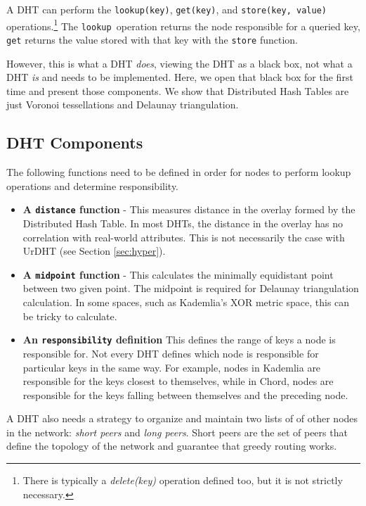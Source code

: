 \documentclass[11pt,conference]{IEEEtran}
\begin{document}
A DHT can perform the \texttt{lookup(key)}, \texttt{get(key)}, and \texttt{store(key, value)} operations.\footnote{There is typically a \textit{delete(key)} operation defined too, but it is not strictly necessary.}
The \texttt{lookup }operation returns the node responsible for a queried key, \texttt{get} returns the value stored with that key with the \texttt{store} function.

However, this is what a DHT \textit{does}, viewing the DHT as a black box, not what a DHT \textit{is} and needs to be implemented.
Here, we open that black box for the first time and present those components.
We show that Distributed Hash Tables are just Voronoi tessellations and Delaunay triangulation.


\subsection{DHT Components}
The following functions need to be defined in order for nodes to perform lookup operations and determine responsibility.

\begin{itemize}
	\item \textbf{A \texttt{distance} function } - 
	This measures distance in the overlay formed by the Distributed Hash Table.
	In most DHTs, the distance in the overlay has no correlation with real-world attributes.
	This is not necessarily the case with UrDHT (see Section \ref{sec:hyper}).
	
	\item \textbf{A \texttt{midpoint} function} - This calculates the minimally equidistant point between two given point.
	The midpoint is required for Delaunay triangulation calculation.
	In some spaces, such as Kademlia's XOR metric space, this can be tricky to calculate.  %
	\item \textbf{An \texttt{responsibility} definition}  This defines the range of keys a node is responsible for. 
	Not every DHT defines which node is responsible for particular keys in the same way. 
	For example, nodes in Kademlia are responsible for the keys closest to themselves, while in Chord, nodes are responsible for the keys falling between themselves and the preceding node.
\end{itemize}


A DHT also needs a strategy to organize and maintain two lists of of other nodes in the network: \textit{short peers} and \textit{long peers}.
Short peers are the set of peers that define the topology of the network and guarantee that greedy routing works.
\end{document}
